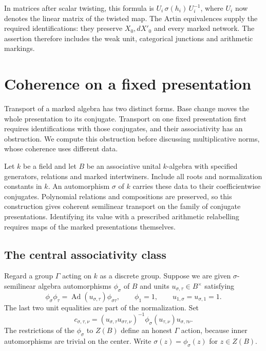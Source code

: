 In matrices after scalar twisting, this formula is
\(U_i\,\sigma(h_i)\,U_i^{-1}\), where \(U_i\) now denotes the
linear matrix of the twisted map.
The Artin equivalences supply the required identifications:
they preserve \(X_0,dX'_0\) and every marked network.
The assertion therefore includes the weak unit, categorical
junctions and arithmetic markings.


\section{Coherence on a fixed presentation}
\label{v4-arith:at:fixed-presentation}

Transport of a marked algebra has two distinct forms. Base change
moves the whole presentation to its conjugate. Transport on one fixed
presentation first requires identifications with those conjugates,
and their associativity has an obstruction. We compute this
obstruction before discussing multiplicative norms, whose coherence uses different data.

Let $k$ be a field and let $B$ be an associative unital $k$-algebra
with specified generators, relations and marked intertwiners. Include
all roots and normalization constants in $k$. An automorphism
$\sigma$ of $k$ carries these data to their coefficientwise
conjugates. Polynomial relations and compositions are preserved,
so this construction gives coherent semilinear transport on the
family of conjugate presentations. Identifying its value with a
prescribed arithmetic relabelling requires maps of the marked
presentations themselves.

\subsection{The central associativity class}

Regard a group $\Gamma$ acting on $k$ as a discrete group. Suppose
we are given $\sigma$-semilinear algebra automorphisms $\phi_\sigma$
of $B$ and units $u_{\sigma,\tau}\in B^\times$ satisfying
\begin{equation}\label{v4-arith:at:eq:weak}
 \phi_\sigma\phi_\tau
  =\operatorname{Ad}(u_{\sigma,\tau})\phi_{\sigma\tau},
 \qquad \phi_1=1,\qquad u_{1,\sigma}=u_{\sigma,1}=1.
\end{equation}
The last two unit equalities are part of the normalization.
Set
\begin{equation}\label{v4-arith:at:eq:cocycle}
 c_{\sigma,\tau,\nu}
 =(u_{\sigma,\tau}u_{\sigma\tau,\nu})^{-1}
    \phi_\sigma(u_{\tau,\nu})u_{\sigma,\tau\nu}.
\end{equation}
The restrictions of the $\phi_\sigma$ to $Z(B)$ define an honest
$\Gamma$ action, because inner automorphisms are trivial on the center.
Write \(\sigma(z)=\phi_\sigma(z)\) for \(z\in Z(B)\).

